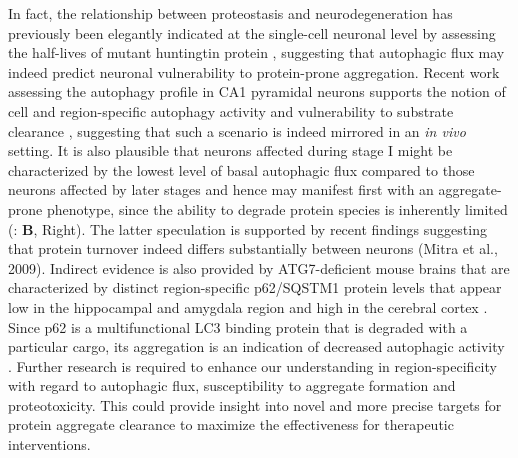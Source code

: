 In fact, the relationship between proteostasis and neurodegeneration has previously been elegantly indicated at the single-cell neuronal level by assessing the half-lives of mutant huntingtin protein \citep{Tsvetkov2013}, suggesting that autophagic flux may indeed predict neuronal vulnerability to protein-prone aggregation. Recent work assessing the autophagy profile in CA1 pyramidal neurons supports the notion of cell and region-specific autophagy activity and vulnerability to substrate clearance \citep{Bordi2016}, suggesting that such a scenario is indeed mirrored in an \textit{in vivo} setting. It is also plausible that neurons affected during stage I might be characterized by the lowest level of basal autophagic flux compared to those neurons affected by later stages and hence may manifest first with an aggregate-prone phenotype, since the ability to degrade protein species is inherently limited (: \textbf{B}, Right). The latter speculation is supported by recent findings suggesting that protein turnover indeed differs substantially between neurons (Mitra et al., 2009). Indirect evidence is also provided by ATG7-deficient mouse brains that are characterized by distinct region-specific p62/SQSTM1 protein levels that appear low in the hippocampal and amygdala region and high in the cerebral cortex \citep{Komatsu2007}. Since p62 is a multifunctional LC3 binding protein that is degraded with a particular cargo, its aggregation is an indication of decreased autophagic activity \citep{Komatsu2007}. Further research is required to enhance our understanding in region-specificity with regard to autophagic flux, susceptibility to aggregate formation and proteotoxicity. This could provide insight into novel and more precise targets for protein aggregate clearance to maximize the effectiveness for therapeutic interventions. 

